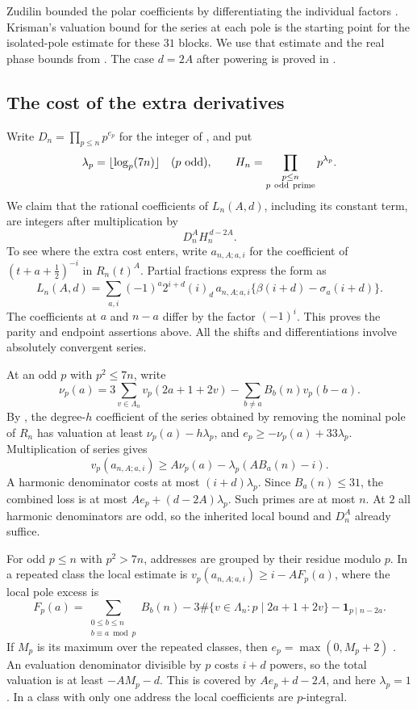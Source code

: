 \documentclass[11pt]{article}
\numberwithin{equation}{section}
\begin{document}
Zudilin bounded the polar coefficients by differentiating the
individual factors \cite[proof of Lemma~4]{zudbeta}. Krisman's
valuation bound for the series at each pole \cite[Lemma~4.3]{krisman}
is the starting point for the isolated-pole estimate for these \(31\)
blocks. We use that estimate and the real phase bounds from
\cite[Sections~3--5 and Appendix~A]{fifteen}. The case \(d=2A\)
after powering is proved in \cite[Sections~3--5]{two}.

\subsection{The cost of the extra derivatives}

Write \(D_n=\prod_{p\le n}p^{e_p}\) for the integer of
\cite[Section 3 and Appendix A]{fifteen}, and put
\[
 \lambda_p=\lfloor\log_p(7n)\rfloor\quad(p\text{ odd}),\qquad
 H_n=\prod_{\substack{p\le n\\p\ {\rm odd\ prime}}}p^{\lambda_p}.
\]
We claim that the rational coefficients of \(L_n(A,d)\), including
its constant term, are integers after multiplication by
\begin{equation}\label{eq:clear}
                          D_n^A H_n^{\,d-2A}.
\end{equation}
To see where the extra cost enters, write \(a_{n,A;a,i}\) for
the coefficient of \((t+a+\tfrac12)^{-i}\) in \(R_n(t)^A\).
Partial fractions express the form as
\[
 L_n(A,d)=\sum_{a,i}(-1)^a 2^{i+d}(i)_d\,a_{n,A;a,i}
                       \{\beta(i+d)-\sigma_a(i+d)\}.
\]
The coefficients at \(a\) and \(n-a\) differ by the factor \((-1)^i\).
This proves the parity and endpoint assertions above. All the
shifts and differentiations involve absolutely convergent series.

At an odd \(p\) with \(p^2\le7n\), write
\[
 \nu_p(a)=3\sum_{v\in\Lambda_n}v_p(2a+1+2v)
             -\sum_{b\ne a} B_b(n)v_p(b-a).
\]
By \cite[Appendix A]{fifteen}, the degree-\(h\) coefficient of the
series obtained by removing the nominal pole of \(R_n\)
has valuation at least \(\nu_p(a)-h\lambda_p\), and
\(e_p\ge-\nu_p(a)+33\lambda_p\). Multiplication of series gives
\[
  v_p(a_{n,A;a,i})\ge A\nu_p(a)-\lambda_p(AB_a(n)-i).
\]
A harmonic denominator costs at most \((i+d)\lambda_p\). Since
\(B_a(n)\le31\), the combined loss is at most \(Ae_p+(d-2A)\lambda_p\).
Such primes are at most \(n\). At \(2\) all harmonic denominators are
odd, so the inherited local bound and \(D_n^A\) already suffice.

For odd \(p\le n\) with \(p^2>7n\), addresses are grouped by their
residue modulo \(p\). In a repeated class the local estimate is
\(v_p(a_{n,A;a,i})\ge i-AF_p(a)\), where the local pole excess is
\[
 F_p(a)=\sum_{\substack{0\le b\le n\\b\equiv a\bmod p}} B_b(n)
        -3\#\{v\in\Lambda_n:p\mid 2a+1+2v\}-\mathbf 1_{p\mid n-2a}.
\]
If \(M_p\) is its maximum over the repeated classes, then
\(e_p=\max(0,M_p+2)\) \cite[Section 3]{fifteen}.
An evaluation denominator divisible by \(p\) costs \(i+d\) powers,
so the total valuation is at least \(-AM_p-d\). This is covered by
\(Ae_p+d-2A\), and here \(\lambda_p=1\). In a class with only one
address the local coefficients are \(p\)-integral.
\end{document}
